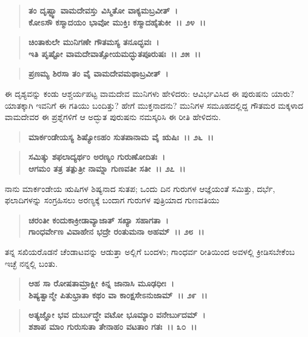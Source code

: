 \begin{verse}
\textbf{ತಂ ದೃಷ್ಟ್ವಾ ವಾಮದೇವಸ್ತು ವಿಸ್ಮಿತೋ ವಾಕ್ಯಮಬ್ರವೀತ್~।}\\\textbf{ಕೋಽಸೌ ಕಸ್ಮಾದಯಂ ಭಾವೋ ಮುಕ್ತಿಃ ಕಸ್ಮಾದಹೈತುಕೀ~।। ೨೪~।। }
\end{verse}

\begin{verse}
\textbf{ಚಿಂತಾಕುಲೇ ಮುನಿಗಣೇ ಗೌತಮಸ್ಯ ತನೂದ್ಭವಃ~।}\\\textbf{ಇತಿ ಪೃಷ್ಟೋ ವಾಮದೇವಾತ್ಸೋಯಮದ್ಭುತಪೂರುಷಃ~।। ೨೫~।।}
\end{verse}

\begin{verse}
\textbf{ಪ್ರಣಮ್ಯ ಶಿರಸಾ ತಂ ವೈ ವಾಮದೇವಮಥಾಬ್ರವೀತ್~।}
\end{verse}

ಈ ದೃಶ್ಯವನ್ನು ಕಂಡು ಆಶ್ಚರ್ಯಪಟ್ಟ ವಾಮದೇವ ಮುನಿಗಳು ಹೇಳಿದರು: ಆವಿರ್ಭವಿಸಿದ ಈ ಪುರುಷನು ಯಾರು? ಯಾತಕ್ಕಾಗಿ ಇವನಿಗೆ ಈ ಗತಿಯು ಬಂದಿತ್ತು? ಹೇಗೆ ಮುಕ್ತನಾದನು? ಮುನಿಗಳ ಸಮೂಹದಲ್ಲಿದ್ದ ಗೌತಮರ ಮಕ್ಕಳಾದ ವಾಮದೇವರ ಈ ಪ್ರಶ್ನೆಗಳಿಗೆ ಆ ಅದ್ಭುತ ಪುರುಷನು ನಮಸ್ಕರಿಸಿ ಈ ರೀತಿ ಹೇಳಿದನು.

\begin{verse}
\textbf{ಮಾರ್ಕಂಡೇಯಸ್ಯ ಶಿಷ್ಯೋಽಹಂ ಸುತಪಾನಾಮ ವೈ ಋಷಿಃ~।। ೨೬~।।} 
\end{verse}

\begin{verse}
\textbf{ಸಮಿತ್ಕು ಶಫಲಾದ್ಯರ್ಥಂ ಅರಣ್ಯಂ ಗುರುಣೋದಿತಃ~।}\\\textbf{ಆಗಮಂ ತತ್ರ ತತ್ಪುತ್ರೀ ನಾಮ್ನಾ ಗುಣವತೀ ಸತೀ~।। ೨೭~।।}
\end{verse}

ನಾನು ಮಾರ್ಕಂಡೇಯ ಋಷಿಗಳ ಶಿಷ್ಯನಾದ ಸುತಪ; ಒಂದು ದಿನ ಗುರುಗಳ ಆಜ್ಞೆಯಂತೆ ಸಮಿತ್ತು, ದರ್ಭೆ, ಫಲಾದಿಗಳನ್ನು ಸಂಗ್ರಹಿಸಲು ಅರಣ್ಯಕ್ಕೆ ಬಂದಾಗ ಗುರುಗಳ ಪುತ್ರಿಯಾದ ಗುಣವತಿಯು

\begin{verse}
\textbf{ಚರಂತೀ ಕಂದುಕಾಕ್ರೀಡಾವ್ಯಾಜಾತ್ ಸಖ್ಯಾ ಸಹಾಗತಾ~।}\\\textbf{ಗಾಂಧರ್ವೇಣ ವಿವಾಹೇನ ಭದ್ರೇ ರಂತುಮನಾ ಅಹಮ್~।। ೨೮~।।}
\end{verse}

ತನ್ನ ಸಖಿಯರೊಡನೆ ಚೆಂಡಾಟವನ್ನು ಆಡುತ್ತಾ ಅಲ್ಲಿಗೆ ಬಂದಳು; ಗಾಂಧರ್ವ ರೀತಿಯಿಂದ ಅವಳಲ್ಲಿ ಕ್ರೀಡಿಸಬೇಕೆಂಬ ಇಚ್ಛೆ ನನ್ನಲ್ಲಿ ಬಂತು.

\begin{verse}
\textbf{ಆಹ ಸಾ ರೋಷತಾಮ್ರಾಕ್ಷೀ ಕಿನ್ನ ಜಾನಾಸಿ ಮೂಢಧೀಃ~।}\\\textbf{ಶಿಷ್ಯತ್ವಾನ್ಮೇ ಪಿತುಭ್ರಾತಾ ಕಥಂ ವಾ ಕಾಂಕ್ಷಸೇಽನುಜಾಮ್~।। ೨೯~।। }
\end{verse}

\begin{verse}
\textbf{ಅತ್ಯಜ್ಞೋ ಭವ ದುರ್ಬುದ್ಧೇ ವಟೋ ಭೂಮ್ಯಾಂ ವನೇರ್ಬುದಮ್~।}\\\textbf{ಶಶಾಪ ಮಾಂ ಗುರುಸುತಾ ತೇನಾಹಂ ವಟತಾಂ ಗತಃ~।। ೩೦~।।}
\end{verse}

